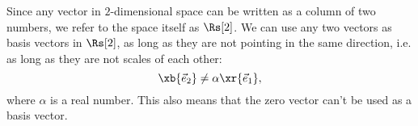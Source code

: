 Since any vector in $2$-dimensional space can be written as a column of two numbers, we refer to the space itself as $\Rs[2]$. We can use any two vectors as basis vectors in $\Rs[2]$, as long as they are not pointing in the same direction, i.e. as long as they are not scales of each other:
\begin{equation}
  \xb{\vec{e}_{2}} \neq \alpha\xr{\vec{e}_{1}},
  \label{eq:basis_vectors_not_scales}
\end{equation}
where $\alpha$ is a real number. This also means that the zero vector can't be used as a basis vector.
%
%
%
%
%
